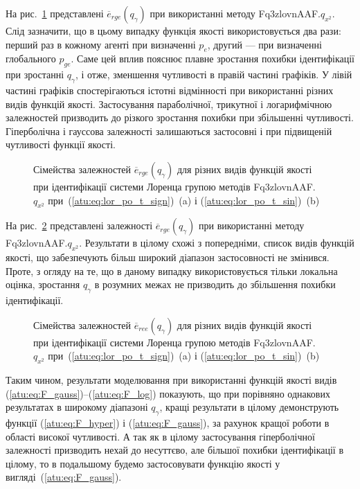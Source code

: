 На рис.~\ref{atu:f:lor_ftype_rge} представлені
$\overline{e}_{rge} (q_\gamma) $ при використанні методу
Fq3zlovnAAF.$q_{x^2}$.
Слід зазначити, що в цьому випадку функція якості
використовується два рази: перший раз в кожному агенті при
визначенні
$p_e $, другий --- при визначенні глобального
$p_{ge} $. Саме цей вплив пояснює плавне зростання похибки
ідентифікації при зростанні
$q_\gamma$, і отже, зменшення чутливості в правій частині графіків. У
лівій частині графіків спостерігаються істотні відмінності
при використанні різних видів функцій якості. Застосування
параболічної, трикутної і логарифмічною залежностей
призводить до різкого зростання похибки при збільшенні
чутливості. Гіперболічна і гауссова залежності залишаються
застосовні і при підвищеній чутливості функції якості.

\begin{figure}[htb!]
  \caption{Сімейства залежностей $\overline{e}_{rge}(q_\gamma) $ для різних видів функцій якості при ідентифікації системи Лоренца групою методів Fq3zlovnAAF.$q_{x^2} $ при~(\ref{atu:eq:lor_po_t_sign})~(a) і (\ref{atu:eq:lor_po_t_sin})~(b)}
  \label{atu:f:lor_ftype_rge}
\end{figure}

На рис.~\ref{atu:f:lor_ftype_ree} представлені залежності
$\overline{e}_{rge} (q_\gamma) $ при використанні методу Fq3zlovnAAF.$q_{x^2}$.
Результати в цілому схожі з попередніми, список
видів функцій якості, що забезпечують більш широкий діапазон
застосовності не змінився. Проте, з огляду на те, що в даному
випадку використовується тільки локальна оцінка, зростання
$q_\gamma $ в розумних межах не призводить до збільшення похибки
ідентифікації.

\begin{figure}[htb!]
  \caption{Сімейства залежностей $\overline{e}_{ree}(q_\gamma)$ для різних видів функцій якості при ідентифікації системи Лоренца групою методів Fq3zlovnAAF.$q_{x^2} $ при~(\ref{atu:eq:lor_po_t_sign})~(a) і (\ref{atu:eq:lor_po_t_sin})~(b)}
  \label{atu:f:lor_ftype_ree}
\end{figure}

Таким чином, результати моделювання при використанні функцій
якості видів (\ref{atu:eq:F_gauss})--(\ref{atu:eq:F_log}) показують, що при
порівняно однакових результатах в широкому діапазоні
$q_\gamma $, кращі результати в цілому демонструють функції
(\ref{atu:eq:F_hyper}) і (\ref{atu:eq:F_gauss}), за рахунок кращої роботи в області
високої чутливості. А так як в цілому застосування гіперболічної
залежності призводить нехай до несуттєво, але більшої похибки
ідентифікації в цілому, то в подальшому будемо застосовувати
функцію якості у вигляді~(\ref{atu:eq:F_gauss}).

